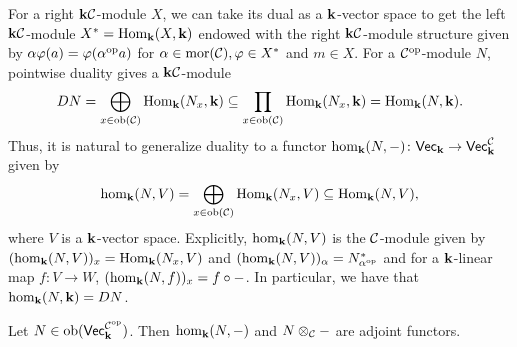 For a right $\mathbf{k}\mathcal{C}$-module $X$, we can take its dual as a $\mathbf{k}$-vector space to get the left $\mathbf{k}\mathcal{C}$-module $X^*=\operatorname{Hom}_{\mathbf{k}}(X,\mathbf{k})$ endowed with the right $\mathbf{k}\mathcal{C}$-module structure given by $\alpha\varphi(a)=\varphi(\alpha^{\text{op}} a)$ for $\alpha\in\operatorname{mor}(\mathcal{C}),\varphi\in X^*$ and $m\in X$.
For a $\mathcal{C}^{\text{op}}$-module $N$, pointwise duality gives a $\mathbf{k}\mathcal{C}$-module 
\[ DN=\bigoplus_{x\in\operatorname{ob}(\mathcal{C})}\operatorname{Hom}_{\mathbf{k}}(N_x,\mathbf{k})\subseteq\prod_{x\in\operatorname{ob}(\mathcal{C})}\operatorname{Hom}_{\mathbf{k}}(N_x,\mathbf{k})=\operatorname{Hom}_{\mathbf{k}}(N,\mathbf{k}). \]
Thus, it is natural to generalize duality to a functor $\hom_{\mathbf{k}}(N, -)\colon\normalfont\mathsf{Vec}_{\mathbf{k}}\to\normalfont\mathsf{Vec}_{\mathbf{k}}^{\mathcal{C}}$ given by
\[ \hom_{\mathbf{k}}(N, V)=\bigoplus_{x\in\operatorname{ob}(\mathcal{C})}\operatorname{Hom}_{\mathbf{k}}(N_x,V)\subseteq\operatorname{Hom}_{\mathbf{k}}(N, V),\]
where $V$ is a $\mathbf{k}$-vector space.
Explicitly, $\hom_{\mathbf{k}}(N, V)$ is the $\mathcal{C}$-module given by $(\hom_{\mathbf{k}}(N, V))_x=\operatorname{Hom}_{\mathbf{k}}(N_x,V)$ and $(\hom_{\mathbf{k}}(N, V))_\alpha=N_{\alpha^{\text{op}}}^*$ and for a $\mathbf{k}$-linear map $f:V\to W$, $(\hom_{\mathbf{k}}(N, f))_x=f\circ -$.
In particular, we have that $\hom_{\mathbf{k}}(N,\mathbf{k})=DN$.
\begin{proposition}\label{prop:TensorHomAdjunction}
    Let $N\in\operatorname{ob}(\normalfont\mathsf{Vec}_{\mathbf{k}}^{\mathcal{C}^{\text{op}}})$. 
    Then $\hom_{\mathbf{k}}(N, -)$ and $N\otimes_{\mathcal{C}} -$ are adjoint functors.
\end{proposition}
